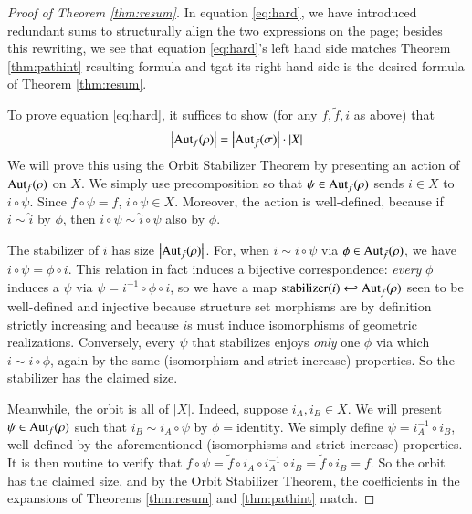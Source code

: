 \documentclass[openany, notitlepage, justified]{tufte-book}
\theoremstyle{plain}
\theoremstyle{definition}
\newcommand{\wabs}[1]{\left|#1\right|}
\newcommand{\Aut}{\text{\textnormal{Aut}}}
\begin{document}
\begin{proof}[Proof of Theorem \ref{thm:resum}]
            In equation \ref{eq:hard}, we have introduced
            redundant sums to structurally align the two expressions on the
            page; besides this rewriting, we see that equation \ref{eq:hard}'s
            left hand side matches Theorem \ref{thm:pathint} resulting formula
            and tgat its right hand side is the desired formula of Theorem
            \ref{thm:resum}. 

            To prove equation \ref{eq:hard}, it suffices to show (for any
            $f, \tilde f, i$ as above) that
            $$
                \wabs{\Aut_f(\rho)}
                =
                \wabs{\Aut_{\tilde f}(\sigma)}
                \cdot
                \wabs{X}
            $$
            We will prove this using the Orbit Stabilizer Theorem by presenting
            an action of $\Aut_f(\rho)$ on $X$.  We simply use precomposition
            so that $\psi\in \Aut_f(\rho)$ sends $i\in X$ to $i\circ \psi$.
            Since $f\circ\psi = f$, $i\circ \psi \in X$.  Moreover, the action
            is well-defined, because if $i\sim \hat i$ by $\phi$, then $i \circ
            \psi \sim \hat i \circ \psi$ also by $\phi$.
            
            The stabilizer of $i$ has size $\wabs{\Aut_{\tilde f}(\rho)}$.
            For, when $i \sim i \circ \psi$ via $\phi \in \Aut_{\tilde
            f}(\rho)$, we have $i\circ \psi = \phi \circ i$.  This relation in
            fact induces a bijective correspondence: \emph{every} $\phi$
            induces a $\psi$ via $\psi = i^{-1} \circ \phi \circ i$, so we have
            a map $\text{stabilizer}(i) \hookleftarrow \Aut_{\tilde f}(\rho)$
            seen to be well-defined and injective because structure set
            morphisms are by definition strictly increasing and because $i$s
            must induce isomorphisms of geometric realizations.  Conversely,
            every $\psi$ that stabilizes enjoys \emph{only} one $\phi$ via
            which $i \sim i \circ \phi$, again by the same (isomorphism and
            strict increase) properties.  So the stabilizer has the claimed
            size.

            Meanwhile, the orbit is all of $\wabs{X}$.  Indeed, suppose $i_A,
            i_B \in X$.  We will present $\psi \in \Aut_f(\rho)$ such that $i_B
            \sim i_A \circ \psi$ by $\phi=\text{identity}$.  We simply define
            $\psi = i_A^{-1} \circ i_B$, well-defined by the aforementioned
            (isomorphisms and strict increase) properties.  It is then routine
            to verify that
            $
                f \circ \psi
                =
                \tilde f \circ i_A \circ i_A^{-1} \circ i_B
                =
                \tilde f \circ i_B
                = f.
            $
            So the orbit has the claimed size, and by the Orbit Stabilizer
            Theorem, the coefficients in the expansions of Theorems 
            \ref{thm:resum} and \ref{thm:pathint} match.
        \end{proof}
\end{document}
